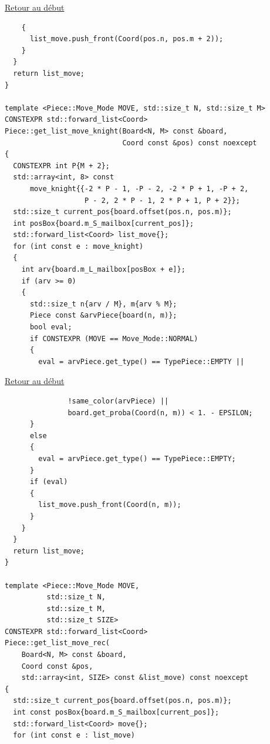 {\begin{frame}[fragile]
\hyperlink{conclusion}{Retour au début}\newline
\begin{verbatim}
    {
      list_move.push_front(Coord(pos.n, pos.m + 2));
    }
  }
  return list_move;
}

template <Piece::Move_Mode MOVE, std::size_t N, std::size_t M>
CONSTEXPR std::forward_list<Coord>
Piece::get_list_move_knight(Board<N, M> const &board,
                            Coord const &pos) const noexcept
{
  CONSTEXPR int P{M + 2};
  std::array<int, 8> const
      move_knight{{-2 * P - 1, -P - 2, -2 * P + 1, -P + 2,
                   P - 2, 2 * P - 1, 2 * P + 1, P + 2}};
  std::size_t current_pos{board.offset(pos.n, pos.m)};
  int posBox{board.m_S_mailbox[current_pos]};
  std::forward_list<Coord> list_move{};
  for (int const e : move_knight)
  {
    int arv{board.m_L_mailbox[posBox + e]};
    if (arv >= 0)
    {
      std::size_t n{arv / M}, m{arv % M};
      Piece const &arvPiece{board(n, m)};
      bool eval;
      if CONSTEXPR (MOVE == Move_Mode::NORMAL)
      {
        eval = arvPiece.get_type() == TypePiece::EMPTY ||
\end{verbatim}
\end{frame}

\begin{frame}[fragile]
\hyperlink{conclusion}{Retour au début}\newline
\begin{verbatim}
               !same_color(arvPiece) ||
               board.get_proba(Coord(n, m)) < 1. - EPSILON;
      }
      else
      {
        eval = arvPiece.get_type() == TypePiece::EMPTY;
      }
      if (eval)
      {
        list_move.push_front(Coord(n, m));
      }
    }
  }
  return list_move;
}

template <Piece::Move_Mode MOVE,
          std::size_t N,
          std::size_t M,
          std::size_t SIZE>
CONSTEXPR std::forward_list<Coord>
Piece::get_list_move_rec(
    Board<N, M> const &board,
    Coord const &pos,
    std::array<int, SIZE> const &list_move) const noexcept
{
  std::size_t current_pos{board.offset(pos.n, pos.m)};
  int const posBox{board.m_S_mailbox[current_pos]};
  std::forward_list<Coord> move{};
  for (int const e : list_move)
\end{verbatim}
\end{frame}

}
